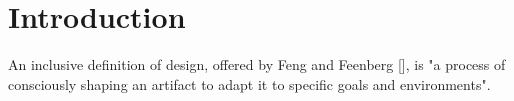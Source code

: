 \documentclass{chi-ext}
\begin{document}



\section{Introduction}

An inclusive definition of design, offered by Feng and Feenberg [], is "a process of consciously shaping an artifact to adapt it to specific goals and environments". 
\end{document}
